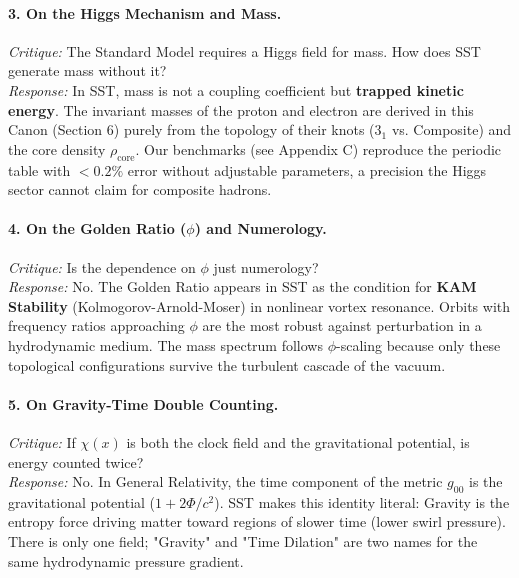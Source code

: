 \documentclass[10pt]{article}
\newcommand{\rhocore}{\rho_{\text{core}}}
\begin{document}
\paragraph{3. On the Higgs Mechanism and Mass.}
\textit{Critique:} The Standard Model requires a Higgs field for mass. How does SST generate mass without it? \\
\textit{Response:} In SST, mass is not a coupling coefficient but \textbf{trapped kinetic energy}. The invariant masses of the proton and electron are derived in this Canon (Section 6) purely from the topology of their knots ($3_1$ vs. Composite) and the core density $\rhocore$. Our benchmarks (see Appendix C) reproduce the periodic table with $<0.2\%$ error without adjustable parameters, a precision the Higgs sector cannot claim for composite hadrons.

\paragraph{4. On the Golden Ratio ($\phi$) and Numerology.}
\textit{Critique:} Is the dependence on $\phi$ just numerology? \\
\textit{Response:} No. The Golden Ratio appears in SST as the condition for \textbf{KAM Stability} (Kolmogorov-Arnold-Moser) in nonlinear vortex resonance. Orbits with frequency ratios approaching $\phi$ are the most robust against perturbation in a hydrodynamic medium. The mass spectrum follows $\phi$-scaling because only these topological configurations survive the turbulent cascade of the vacuum.

\paragraph{5. On Gravity-Time Double Counting.}
\textit{Critique:} If $\chi(x)$ is both the clock field and the gravitational potential, is energy counted twice? \\
\textit{Response:} No. In General Relativity, the time component of the metric $g_{00}$ is the gravitational potential ($1+2\Phi/c^2$). SST makes this identity literal: Gravity is the entropy force driving matter toward regions of slower time (lower swirl pressure). There is only one field; "Gravity" and "Time Dilation" are two names for the same hydrodynamic pressure gradient.


\end{document}
